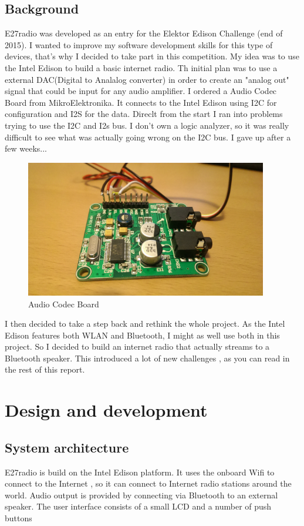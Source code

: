 \documentclass[12pt,a4paper]{scrreprt}
\begin{document}
\section{Background}
E27radio was developed as an entry for the Elektor Edison Challenge (end of 2015). I wanted to improve my software development skills for this type of devices, that's why I decided to take part in this competition.
My idea was to use the Intel Edison to build a basic internet radio.
Th initial plan was to use a external DAC(Digital to Analalog converter) in order to create an "analog out" signal that could be input for any audio amplifier.
I ordered a Audio Codec Board from MikroElektronika. It connects to the Intel Edison using I2C for configuration and I2S for the data. 
Direclt from the start I ran into problems trying to use the I2C and I2s bus.
I don't own a logic analyzer, so it was really difficult to see what was actually going wrong on the I2C bus. I gave up after a few weeks...

\begin{figure}[h]
	\includegraphics[width=400px]{images/audio1}
	\caption{Audio Codec Board}
\end{figure}

I then decided to take a step back and rethink the whole project.
As the Intel Edison features both WLAN and Bluetooth, I might as well use both in this project. 
So I decided to build an internet radio that actually streams to a Bluetooth speaker. This introduced a lot of new challenges , as you can read in the rest of this report.


\chapter{Design and development}


\section{System architecture}
E27radio is build on the Intel Edison platform.
It uses the onboard Wifi to connect to the Internet , so it can connect to Internet radio stations around the world. Audio output is provided by connecting via Bluetooth to an external speaker.
The user interface consists of a small LCD and a number of push buttons
\end{document}

